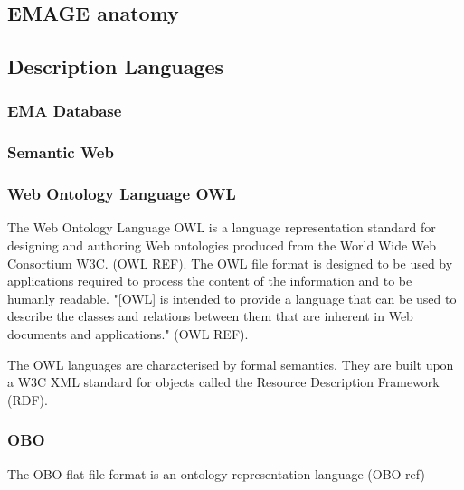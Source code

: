 \subsection{EMAGE anatomy}
\subsection{Description Languages}
\subsubsection{EMA Database}\label{emadb}

\subsubsection{Semantic Web}
\subsubsection{Web Ontology Language OWL}\label{owl}
The Web Ontology Language OWL is a language representation standard for designing and authoring Web ontologies produced from the World Wide Web Consortium W3C. (OWL REF). The OWL file format is designed to be used by applications required to process the content of the information and to be humanly readable. "[OWL] is intended to provide a language that can be used to describe the classes and relations between them that are inherent in Web documents and applications." (OWL REF). 

The OWL languages are characterised by formal semantics. They are built upon a W3C XML standard for objects called the Resource Description Framework (RDF).

\subsubsection{OBO}\label{obo}
The OBO flat file format is an ontology representation language (OBO ref)




















